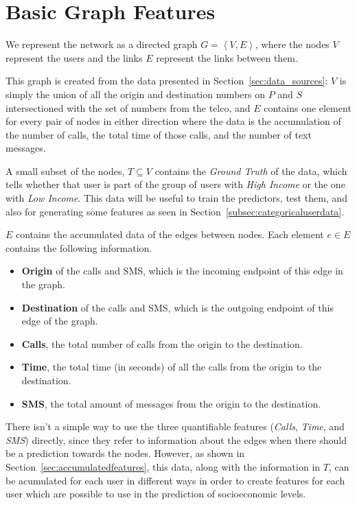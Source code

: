 \section{Basic Graph Features}
\label{sec:graphfeatures}

We represent the network as a directed graph $G = \left< V, E \right>$, where the nodes $V$ represent the users and the links $E$ represent the links between them.

This graph is created from the data presented in Section~\ref{sec:data_sources}: $V$ is simply the union of all the origin and destination numbers on $P$ and $S$ intersectioned with the set of numbers from the telco, and $E$ contains one element for every pair of nodes in either direction where the data is the accumulation of the number of calls, the total time of those calls, and the number of text messages.

A small subset of the nodes, $T \subseteq V$ contains the \emph{Ground Truth} of the data, which tells whether that user is part of the group of users with \emph{High Income} or the one with \emph{Low Income}. This data will be useful to train the predictors, test them, and also for generating some features as seen in Section~\ref{subsec:categoricaluserdata}.

$E$ contains the accumulated data of the edges between nodes. Each element $e \in E$ contains the following information.

\begin{itemize}
	\item \textbf{Origin} of the calls and SMS, which is the incoming endpoint of this edge in the graph.
	\item \textbf{Destination} of the calls and SMS, which is the outgoing endpoint of this edge of the graph.
	\item \textbf{Calls}, the total number of calls from the origin to the destination.
	\item \textbf{Time}, the total time (in seconds) of all the calls from the origin to the destination.
	\item \textbf{SMS}, the total amount of messages from the origin to the destination.
\end{itemize}

There isn't a simple way to use the three quantifiable features (\emph{Calls}, \emph{Time}, and \emph{SMS}) directly, since they refer to information about the edges when there should be a prediction towards the nodes. However, as shown in Section~\ref{sec:accumulatedfeatures}, this data, along with the information in $T$, can be acumulated for each user in different ways in order to create features for each user which are possible to use in the prediction of socioeconomic levels.
